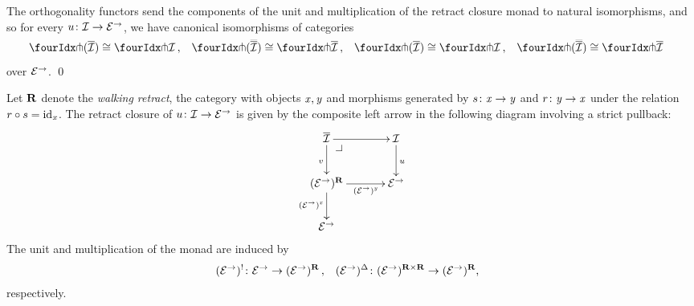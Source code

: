 \documentclass[reqno,10pt,a4paper,oneside,draft]{amsart}
\begin{document}
\begin{proposition} \label{retract-closure}
The orthogonality functors send the components of the unit and multiplication of the retract closure monad to natural isomorphisms, and so for every $u \colon \mathcal{I} \to \mathcal{E}^\to$, we have canonical isomorphisms of categories
\[
\begin{aligned}
  \liftr{(\overline{\cal{I}})} &\iso \liftr{\cal{I}}
\, ,&
  \liftr{(\overline{\overline{\cal{I}}})} &\iso \liftr{\overline{\cal{I}}}
\, ,&
  \liftl{(\overline{\cal{I}})} &\iso \liftl{\cal{I}}
\, ,&
 \liftl{(\overline{\overline{\cal{I}}})} &\iso \liftl{\overline{\cal{I}}}
\end{aligned}
\]
over $\mathcal{E}^\to$.
\qed
\end{proposition}

\begin{remark}
Let $\mathbf{R}$ denote the \emph{walking retract}, \ie the category with objects $\mathit{x}, \mathit{y}$ and morphisms generated by $s \colon \mathit{x} \to \mathit{y}$ and $r \colon \mathit{y} \to \mathit{x}$ under the relation $r \mathbin{\circ} s = \operatorname{id}_{\mathit{x}}$.
The retract closure of $u \colon \mathcal{I} \to \mathcal{E}^\to$ is given by the composite left arrow in the following diagram involving a strict pullback:
\[
\xymatrix@C+1em{
  \overline{\cal{I}}
  \ar[r]
  \ar[d]_v
  \pullback{dr}
&
  \cal{I}
  \ar[d]^{u}
\\
  (\catE^\to)^{\ret}
  \ar[r]_-{(\catE^\to)^{\retB}}
  \ar[d]_{(\catE^\to)^\retA}
&
  \catE^\to
\\
  \catE^\to
}
\]
The unit and multiplication of the monad are induced by
\[
\begin{aligned}
  (\catE^\to)^{\canonical} &\co \catE^\to \to (\catE^\to)^{\ret}
\, ,&
  (\catE^\to)^{\Delta} &\co (\catE^\to)^{\ret \times \ret} \to (\catE^\to)^{\ret}
\rlap{,}
\end{aligned}
\]
respectively.
\end{remark}
\end{document}
